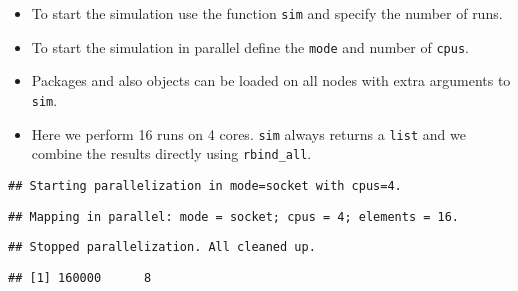 \begin{itemize}
\tightlist
\item
  To start the simulation use the function \texttt{sim} and specify the
  number of runs.
\item
  To start the simulation in parallel define the \texttt{mode} and
  number of \texttt{cpus}.
\item
  Packages and also objects can be loaded on all nodes with extra
  arguments to \texttt{sim}.
\item
  Here we perform 16 runs on 4 cores. \texttt{sim} always returns a
  \texttt{list} and we combine the results directly using
  \texttt{rbind\_all}.
\end{itemize}

\begin{Shaded}
\end{Shaded}

\begin{verbatim}
## Starting parallelization in mode=socket with cpus=4.
\end{verbatim}

\begin{verbatim}
## Mapping in parallel: mode = socket; cpus = 4; elements = 16.
\end{verbatim}

\begin{verbatim}
## Stopped parallelization. All cleaned up.
\end{verbatim}

\begin{verbatim}
## [1] 160000      8
\end{verbatim}
